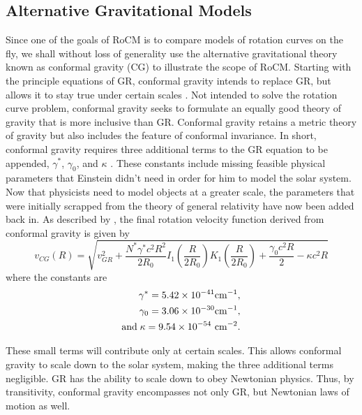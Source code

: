 \documentclass[conference]{IEEEtran-modified}
\providecommand{\e}[1]{\ensuremath{\times 10^{#1}}}
\begin{document}
\subsection{Alternative Gravitational Models}
Since one of the goals of RoCM is to compare models of rotation curves on the fly, we shall without loss of generality use the alternative gravitational theory known as conformal gravity (CG) to illustrate the scope of RoCM.  Starting with the principle equations of GR, conformal gravity intends to replace GR, but allows it to stay true under certain scales \cite{mannheim}. 
Not intended to solve the rotation curve problem, conformal gravity seeks to formulate an equally good theory of gravity that is more inclusive than GR. Conformal gravity retains a metric theory of gravity but also includes the feature of conformal invariance. In short, conformal gravity requires three additional terms to the GR equation to be appended, $\gamma^*$, $\gamma_0$, and $\kappa$ \cite{mannheim}. These constants include missing feasible physical parameters that Einstein didn't need in order for him to model the solar system. Now that physicists need to model objects at a greater scale, the parameters that were initially scrapped from the theory of general relativity have now been added back in.
 As described by \cite{mannheim}, the final rotation velocity function derived from conformal gravity is given by
\begin{equation}
v_{CG}(R) = \sqrt{v_{GR}^2+\frac{N^*\gamma^*c^2R^2}{2R_0}I_1\left(\frac{R}{2R_0}\right)K_1\left(\frac{R}{2R_0}\right)+\frac{\gamma_0c^2R}{2}-\kappa c^2R}
\end{equation}
where the constants are
\begin{equation*}
\begin{split}
\gamma^*=5.42\e{-41} {\rm cm}^{-1}, \\ 
\gamma_0=3.06\e{-30} {\rm cm}^{-1}, \\ 
\text{and}\; \kappa=9.54\e{-54}~{\rm cm}^{-2}.
\end{split}
\end{equation*} 

These small terms will contribute only at certain scales. This allows conformal gravity to scale down to the solar system, making the three additional terms negligible. GR has the ability to scale down to obey Newtonian physics. Thus, by transitivity, conformal gravity encompasses not only GR, but Newtonian laws of motion as well.
\end{document}
